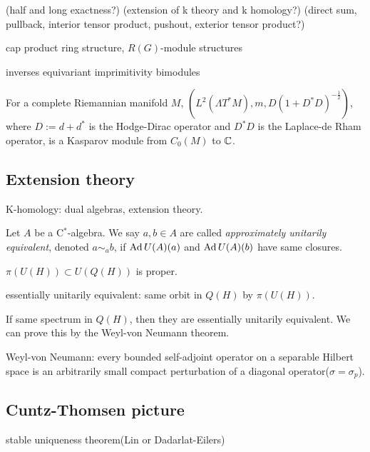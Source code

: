 \documentclass{../../large}
\begin{document}
(half and long exactness?)
(extension of k theory and k homology?)
(direct sum, pullback, interior tensor product, pushout, exterior tensor product?)

cap product
ring structure, $R(G)$-module structures




inverses
equivariant imprimitivity bimodules



\begin{prb}

For a complete Riemannian manifold $M$, $(L^2(\Lambda T^*M),m,D(1+D^*D)^{-\frac12})$, where $D:=d+d^*$ is the Hodge-Dirac operator and $D^*D$ is the Laplace-de Rham operator, is a Kasparov module from $C_0(M)$ to $\mathbb{C}$.
\end{prb}

\section{Extension theory}

K-homology: dual algebras, extension theory.



\begin{prb}
Let $A$ be a C$^*$-algebra.
We say $a,b\in A$ are called \emph{approximately unitarily equivalent}, denoted $a\sim_ab$, if $\operatorname{Ad} U(A)(a)$ and $\operatorname{Ad} U(A)(b)$ have same closures.



$\pi(U(H))\subset U(Q(H))$ is proper.

essentially unitarily equivalent: same orbit in $Q(H)$ by $\pi(U(H))$.

If same spectrum in $Q(H)$, then they are essentially unitarily equivalent.
We can prove this by the Weyl-von Neumann theorem.

Weyl-von Neumann: every bounded self-adjoint operator on a separable Hilbert space is an arbitrarily small compact perturbation of a diagonal operator($\sigma=\sigma_p$).
\end{prb}



\section{Cuntz-Thomsen picture}


stable uniqueness theorem(Lin or Dadarlat-Eilers)


\chapter{}
\end{document}
